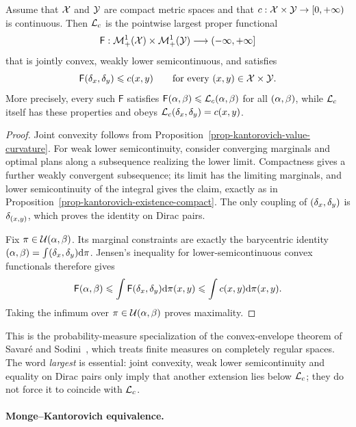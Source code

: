 \begin{thm}\label{thm-kantorovich-maximal-convex-relaxation}
	Assume that $\mathcal{X}$ and $\mathcal{Y}$ are compact metric spaces and that $c:\mathcal{X}\times\mathcal{Y}\to[0,+\infty)$ is continuous. Then $\mathcal{L}_c$ is the pointwise largest proper functional
	\[
		\mathsf F:\mathcal{M}_+^1(\mathcal{X})\times\mathcal{M}_+^1(\mathcal{Y})\longrightarrow(-\infty,+\infty]
	\]
	that is jointly convex, weakly lower semicontinuous, and satisfies
	\[
		\mathsf F(\delta_x,\delta_y)\leqslant c(x,y)
		\qquad\text{for every }(x,y)\in\mathcal{X}\times\mathcal{Y}.
	\]
	More precisely, every such $\mathsf F$ satisfies $\mathsf F(\alpha,\beta)\leqslant\mathcal{L}_c(\alpha,\beta)$ for all $(\alpha,\beta)$,
	while $\mathcal{L}_c$ itself has these properties and obeys $\mathcal{L}_c(\delta_x,\delta_y)=c(x,y)$.
\end{thm}
\begin{proof}
	Joint convexity follows from Proposition~\ref{prop-kantorovich-value-curvature}. For weak lower semicontinuity, consider converging marginals and optimal plans along a subsequence realizing the lower limit. Compactness gives a further weakly convergent subsequence; its limit has the limiting marginals, and lower semicontinuity of the integral gives the claim, exactly as in Proposition~\ref{prop-kantorovich-existence-compact}. The only coupling of $(\delta_x,\delta_y)$ is $\delta_{(x,y)}$, which proves the identity on Dirac pairs.

	Fix $\pi\in\mathcal{U}(\alpha,\beta)$. Its marginal constraints are exactly the barycentric identity $(\alpha,\beta)=\int(\delta_x,\delta_y)\mathrm{d}\pi$.
	Jensen's inequality for lower-semicontinuous convex functionals therefore gives
	\[
		\mathsf F(\alpha,\beta)
		\leqslant\int\mathsf F(\delta_x,\delta_y)\mathrm{d}\pi(x,y)
		\leqslant\int c(x,y)\mathrm{d}\pi(x,y).
	\]
	Taking the infimum over $\pi\in\mathcal{U}(\alpha,\beta)$ proves maximality.
\end{proof}

This is the probability-measure specialization of the convex-envelope theorem of Savar\'e and Sodini~\cite[Theorem~4.4]{SavareSodini2022}, which treats finite measures on completely regular spaces. The word \emph{largest} is essential: joint convexity, weak lower semicontinuity and equality on Dirac pairs only imply that another extension lies below $\mathcal{L}_c$; they do not force it to coincide with $\mathcal{L}_c$.

\paragraph{Monge--Kantorovich equivalence.}

